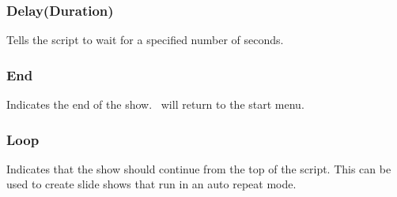 \subsubsection{Delay(Duration)}
Tells the script to wait for a specified number of seconds.

\subsubsection{End}
Indicates the end of the show. \softwarename\ will return to the start menu.

\subsubsection{Loop}
Indicates that the show should continue from the top of the script. This can be used to create slide shows that run in an auto repeat mode.

